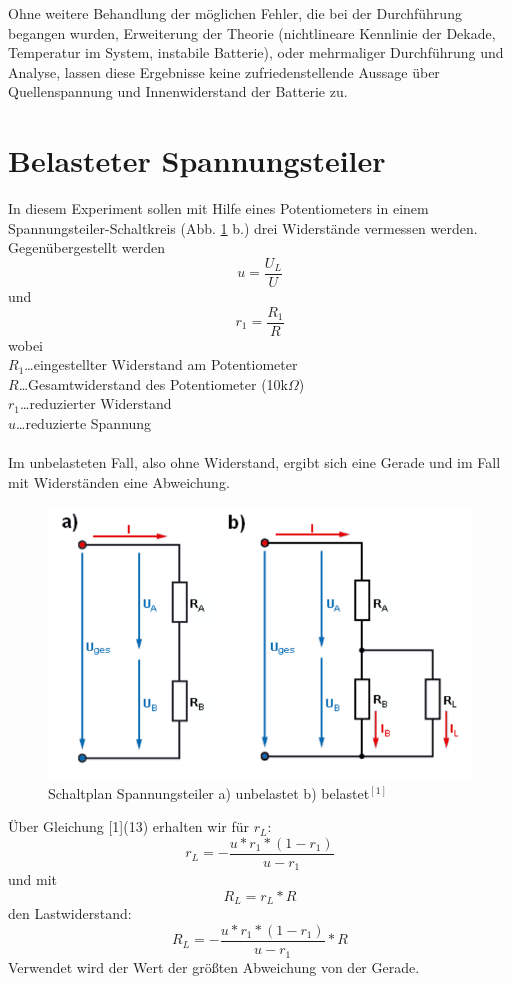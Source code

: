 \documentclass[12pt,a4paper]{article}
\begin{document}
\begin{multicols}{2}
Ohne weitere Behandlung der möglichen Fehler, die bei der Durchführung begangen wurden, Erweiterung der Theorie (nichtlineare Kennlinie der Dekade, Temperatur im System, instabile Batterie), oder mehrmaliger Durchführung und Analyse, lassen diese Ergebnisse keine zufriedenstellende Aussage über Quellenspannung und Innenwiderstand der Batterie zu.


\section{Belasteter Spannungsteiler}
In diesem Experiment sollen mit Hilfe eines Potentiometers in einem Spannungsteiler-Schaltkreis (Abb. \ref{fig:schaltbild_spannungsteiler} b.) drei Widerstände vermessen werden. \\
Gegenübergestellt werden
$$u = \frac{U_L}{U}$$
und
$$r_1 = \frac{R_1}{R}$$
wobei\\
$R_1$\ldots eingestellter Widerstand am Potentiometer  \\
$R$\ldots Gesamtwiderstand des Potentiometer (10k$\Omega$)\\
$r_1$\ldots reduzierter Widerstand \\
$u$\ldots reduzierte Spannung\\
\\

Im unbelasteten Fall, also ohne Widerstand, ergibt sich eine Gerade und im Fall mit Widerständen eine Abweichung. 

\begin{figure}[H]
	\centering
	\includegraphics[scale=0.3]{./figure/spannungsteiler_schaltplan.png}
	\caption{Schaltplan Spannungsteiler a) unbelastet b) belastet$^{[1]}$}
	\label{fig:schaltbild_spannungsteiler}
\end{figure}
\noindent
Über Gleichung [1](13) erhalten wir für $r_L$:
$$r_L = - \frac{u*r_1 * (1-r_1)}{u-r_1}$$
und mit 
$$R_L = r_L * R$$
den Lastwiderstand:\\
$$R_L = - \frac{u*r_1 * (1-r_1)}{u-r_1} * R$$
Verwendet wird der Wert der größten Abweichung von der Gerade.




\end{multicols}
\end{document}
